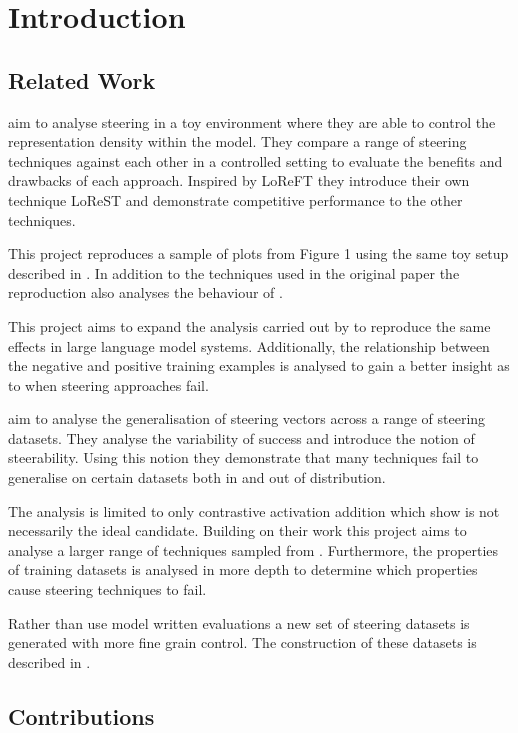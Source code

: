 \chapter{Introduction}

\section{Related Work}

aim to analyse steering in a toy environment where they are able to control the representation density within the model.
They compare a range of steering techniques \cite{caa, reft, mimic} against each other in a controlled setting to evaluate the benefits and drawbacks of each approach.
Inspired by LoReFT \cite{reft} they introduce their own technique LoReST and demonstrate competitive performance to the other techniques.

This project reproduces a sample of plots from Figure 1 using the same toy setup described in .
In addition to the techniques used in the original paper the reproduction also analyses the behaviour of \cite{ace}.

This project aims to expand the analysis carried out by \citet{steering-clear} to reproduce the same effects in large language model systems.
Additionally, the relationship between the negative and positive training examples is analysed to gain a better insight as to when steering approaches fail.

aim to analyse the generalisation of steering vectors across a range of steering datasets.
They analyse the variability of success and introduce the notion of steerability.
Using this notion they demonstrate that many techniques fail to generalise on certain datasets both in and out of distribution.

The analysis is limited to only contrastive activation addition \cite{caa} which \citet{steering-clear} show is not necessarily the ideal candidate.
Building on their work this project aims to analyse a larger range of techniques sampled from \citet{steering-clear}.
Furthermore, the properties of training datasets is analysed in more depth to determine which properties cause steering techniques to fail.

Rather than use model written evaluations \cite{mwe} a new set of steering datasets is generated with more fine grain control.
The construction of these datasets is described in .


\section{Contributions}
